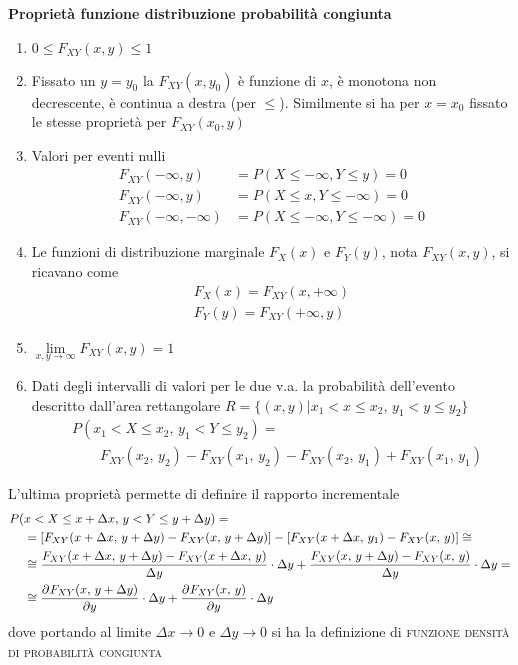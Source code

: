 \textbf{Proprietà funzione distribuzione probabilità congiunta}
\begin{enumerate}
\item $0\leq F_{XY}(x,y)\leq 1$
\item Fissato un $y=y_0$ la $F_{XY}(x,y_0)$ è funzione di $x$, è monotona non decrescente, è continua a destra (per $\leq$).
Similmente si ha per $x=x_0$ fissato le stesse proprietà per $F_{XY}(x_0,y)$
\item Valori per eventi nulli
\[\begin{split}
F_{XY}(-\infty,y)&=P(X\leq -\infty,Y\leq y)=0 \\
F_{XY}(-\infty,y)&=P(X\leq x,Y\leq -\infty)=0 \\
F_{XY}(-\infty,-\infty)&=P(X\leq -\infty,Y\leq -\infty)=0
\end{split}\]
\item Le funzioni di distribuzione marginale $F_X(x)$ e $F_Y(y)$, nota $F_{XY}(x,y)$, si ricavano come
\[\begin{split}
F_X(x)=F_{XY}(x,+\infty)\\F_Y(y)=F_{XY}(+\infty,y)
\end{split}\]
\item $\lim\limits_{x,y\to\infty}F_{XY}(x,y)=1$
\item Dati degli intervalli di valori per le due v.a. la probabilità dell'evento descritto dall'area rettangolare $R=\{(x,y)|x_1<x\leq x_2,\, y_1<y\leq y_2\}$
\[\begin{split}
&P(x_1<X\leq x_2,\,y_1<Y\leq y_2)=\\&\qquad F_{XY}(x_2,\,y_2)-F_{XY}(x_1,\,y_2)-F_{XY}(x_2,\,y_1)+F_{XY}(x_1,\,y_1)\end{split}\]
\end{enumerate}
L'ultima proprietà permette di definire il rapporto incrementale \[\begin{split}P(&x<X\leq x+\Delta x,\,y<Y\leq y+\Delta y)=\\
&=\left[F_{XY}(x+\Delta x,\,y+\Delta y)-F_{XY}(x,\,y+\Delta y)\right]-\left[F_{XY}(x+\Delta x,\,y_1)-F_{XY}(x,\,y)\right]\cong\\
&\cong\frac{F_{XY}(x+\Delta x,\,y+\Delta y)-F_{XY}(x+\Delta x,\,y)}{\Delta y}\cdot\Delta y+\frac{F_{XY}(x,\,y+\Delta y)-F_{XY}(x,\,y)}{\Delta y}\cdot\Delta y=\\
&\cong\frac{\partial^{}F_{XY}(x,\,y+\Delta y)}{\partial y^{}}\cdot\Delta y+\frac{\partial^{}F_{XY}(x,\,y)}{\partial y^{}}\cdot\Delta y
\end{split}\]
dove portando al limite $\Delta x\to 0$ e $\Delta y\to 0$ si ha la definizione di \textsc{funzione densità di probabilità congiunta}
